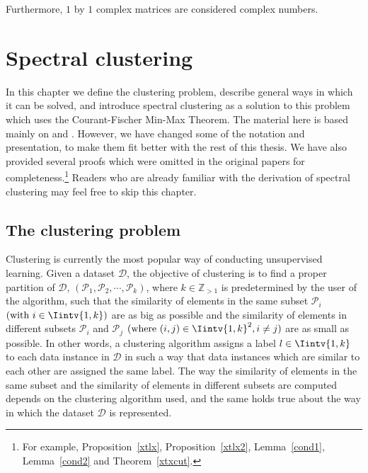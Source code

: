 Furthermore, $1$ by $1$ complex matrices are considered complex numbers.





\chapter{Spectral clustering}
In this chapter we define the clustering problem, describe general ways in which it can be solved, and introduce
spectral clustering as a solution to this problem which uses the Courant-Fischer Min-Max Theorem.
The material here is based mainly on \cite{ng} and \cite{tutorial}.
However, we have changed some of the notation and presentation, to make them fit better with the rest of this thesis.
We have also provided several proofs which were omitted in the original papers for completeness.\footnote{For example, Proposition~\vref{xtlx}, Proposition~\vref{xtlx2}, Lemma~\vref{cond1}, Lemma~\vref{cond2} and Theorem~\vref{xtxcut}.}
Readers who are already familiar with the derivation of spectral clustering may feel free to skip this chapter. 

\section{The clustering problem}

Clustering is currently the most popular way of conducting unsupervised learning. 
Given a dataset $\mathcal D$, the objective of clustering is to find a proper partition of $\mathcal D$, $(\mathcal P_1, \mathcal P_2, \cdots, \mathcal P_k)$, where $k \in \mathbb Z_{>1}$ is predetermined by the user of the algorithm, such that the similarity of elements in the same subset $\mathcal P_i$  $(\text{with } i \in \Iintv{1,k})$ are as big as possible and the similarity of elements in different subsets $\mathcal P_i$ and $\mathcal P_j$ $(\text{where } (i,j) \in \Iintv{1,k}^2, i \ne j)$ are as small as possible. 
In other words, a clustering algorithm assigns a label $l \in \Iintv{1,k}$ to each data instance in $\mathcal D$ in such a way that data instances which are similar to each other are assigned the same label.
The way the similarity of elements in the same subset and the similarity of elements in different subsets are computed depends on the clustering algorithm used, and the same holds true about the way in which the dataset $\mathcal D$ is represented.

